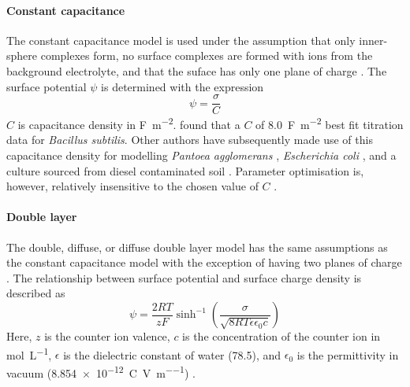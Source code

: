 \paragraph{Constant capacitance} The constant capacitance model is used under the assumption that only inner-sphere complexes form, no surface complexes are formed with ions from the background electrolyte, and that the suface has only one plane of charge \parencite{Goldberg1995}. The surface potential $ \psi $ is determined with the expression \parencite{Ngwenya2003}
\begin{equation}
\psi = \frac{\sigma}{C}
\end{equation}
$ C $ is capacitance density in \si{\farad\per\meter\squared}. \textcite{Fein1997} found that a $ C $ of \SI{8.0}{\farad\per\meter\squared} best fit titration data for \textit{Bacillus subtilis}. Other authors have subsequently made use of this capacitance density for modelling \textit{Pantoea agglomerans} \parencite{Ngwenya2009}, \textit{Escherichia coli} \parencite{Chang2020}, and a culture sourced from diesel contaminated soil \parencite{Ngwenya2003}. Parameter optimisation is, however, relatively insensitive to the chosen value of $ C $ \parencite{Lutzenkirchen1999}.

\paragraph{Double layer}

The double, diffuse, or diffuse double layer model has the same assumptions as the constant capacitance model with the exception of having two planes of charge \parencite{Goldberg1995}. The relationship between surface potential and surface charge density is described as \parencite{Turner2005}
\begin{equation}
\psi = \frac{2RT}{zF} \sinh^{-1} \left( \frac{\sigma}{\sqrt{8RT\epsilon\epsilon_0c}} \right)
\end{equation}
Here, $ z $ is the counter ion valence, $ c $ is the concentration of the counter ion in \si{\mole\per\liter}, $ \epsilon $ is the dielectric constant of water (78.5), and $ \epsilon_0 $ is the permittivity in vacuum (\SI{8.854e-12}{\coulomb\per\volt\per\meter}) \parencite{Huang2014}. 

